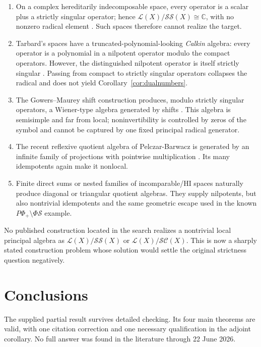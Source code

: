 \documentclass[11pt]{article}
\theoremstyle{definition}
\newcommand{\Lop}{\mathcal L}
\newcommand{\SSing}{\mathcal{SS}}
\newcommand{\SCos}{\mathcal{SC}}
\newcommand{\PhiS}{\Phi\mathcal S}
\newcommand{\PPhiP}{P\Phi_+}
\begin{document}
\begin{enumerate}[leftmargin=2em]
\item On a complex hereditarily indecomposable space, every operator is a scalar plus a
strictly singular operator; hence \(\Lop(X)/\SSing(X)\cong\mathbb C\), with no nonzero
radical element \cite{Ferenczi1997}.  Such spaces therefore cannot realize the target.

\item Tarbard's spaces have a truncated-polynomial-looking \emph{Calkin} algebra: every
operator is a polynomial in a nilpotent operator modulo the compact operators.  However,
the distinguished nilpotent operator is itself strictly singular \cite{Tarbard2012}.  Passing
from compact to strictly singular operators collapses the radical and does not yield
Corollary~\ref{cor:dualnumbers}.

\item The Gowers--Maurey shift construction produces, modulo strictly singular operators,
a Wiener-type algebra generated by shifts \cite{GM1997}.  This algebra is semisimple and
far from local; noninvertibility is controlled by zeros of the symbol and cannot be captured
by one fixed principal radical generator.

\item The recent reflexive quotient algebra of Pelczar-Barwacz is generated by an infinite
family of projections with pointwise multiplication \cite{PB2024}.  Its many idempotents
again make it nonlocal.

\item Finite direct sums or nested families of incomparable/HI spaces naturally produce
diagonal or triangular quotient algebras.  They supply nilpotents, but also nontrivial
idempotents and the same geometric escape used in the known
\(\PPhiP\setminus\PhiS\) example.
\end{enumerate}

No published construction located in the search realizes a nontrivial local principal
algebra as \(\Lop(X)/\SSing(X)\) or \(\Lop(X)/\SCos(X)\).  This is now a sharply stated
construction problem whose solution would settle the original strictness question
negatively.

\section{Conclusions}

The supplied partial result survives detailed checking.  Its four main theorems are valid,
with one citation correction and one necessary qualification in the adjoint corollary.  No
full answer was found in the literature through 22 June 2026.
\end{document}
